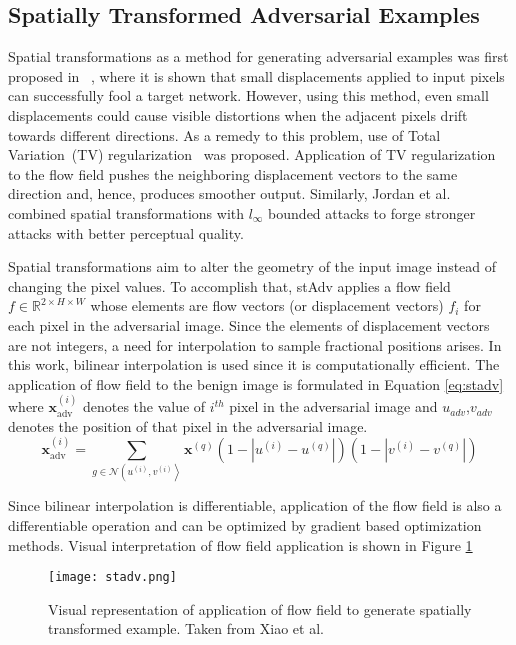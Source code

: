 \subsection{Spatially Transformed Adversarial Examples}

Spatial transformations as a method for generating adversarial examples was first proposed in ~\cite{xiao2018spatially}, where it is shown that small displacements applied to input pixels can successfully fool a target network. However, using this method, even small displacements could cause visible distortions when the adjacent pixels drift towards different directions. As a remedy to this problem, use of Total Variation~(TV) regularization~\cite{estrela2016total} was proposed. Application of TV regularization to the flow field pushes the neighboring displacement vectors to the same direction and, hence, produces smoother output. Similarly, Jordan et al.~\cite{jordan2019quantifying} combined spatial transformations with \(l_\infty\) bounded attacks to forge stronger attacks with better perceptual quality.

Spatial transformations aim to alter the geometry of the input image instead of changing the pixel values. To accomplish that, stAdv applies a flow field \(f \in \mathbb{R}^{2\times H \times W}\) whose elements are flow vectors (or displacement vectors) \(f_i\) for each pixel in the adversarial image. Since the elements of displacement vectors are not integers, a need for interpolation to sample fractional positions arises. In this work, bilinear interpolation is used since it is computationally efficient. The application of flow field to the benign image is formulated in Equation \ref{eq:stadv} where \(\mathbf{x}_{\mathrm{adv}}^{(i)}\) denotes the value of $i^{th}$ pixel in the adversarial image and \(u_{adv}\),\(v_{adv}\) denotes the position of that pixel in the adversarial image.
\begin{equation}
    \label{eq:stadv}
    \mathbf{x}_{\mathrm{adv}}^{(i)}=\sum_{g \in \mathcal{N}\left(u^{(i)}, v^{(i)}\right\rangle} \mathbf{x}^{(q)}\left(1-\left|u^{(i)}-u^{(q)}\right|\right)\left(1-\left|v^{(i)}-v^{(q)}\right|\right)
\end{equation}

Since bilinear interpolation is differentiable, application of the flow field is also a differentiable operation and can be optimized by gradient based optimization methods. Visual interpretation of flow field application is shown in Figure \ref{fig:stadv}

\begin{figure}[h]
    \texttt{[image: stadv.png]}
    \caption{Visual representation of application of flow field to generate spatially transformed example. Taken from Xiao et al. \cite{xiao2018spatially}}\label{fig:stadv}

\end{figure}

